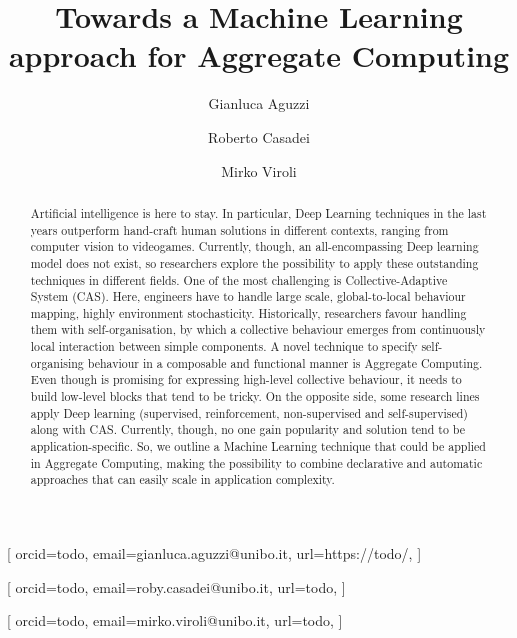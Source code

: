 \documentclass[
]{ceurart}
\begin{document}


\title{Towards a Machine Learning approach for Aggregate Computing} %

\author[1]{Gianluca Aguzzi}[%
orcid=todo,
email=gianluca.aguzzi@unibo.it,
url=https://todo/,
]
\author[2]{Roberto Casadei}[%
orcid=todo,
email=roby.casadei@unibo.it,
url=todo,
]
\author[2]{Mirko Viroli}[%
orcid=todo,
email=mirko.viroli@unibo.it,
url=todo,
]
\address[1]{Alma Mater Studiorum - Università di Bologna,
  Cesena, Italy}
\begin{abstract}
  Artificial intelligence is here to stay. 
  In particular, Deep Learning techniques in the last years outperform hand-craft human solutions in different contexts, ranging from computer vision to videogames.
  Currently, though, an all-encompassing Deep learning model does not exist, so researchers explore the possibility to apply these outstanding techniques in different fields.
  One of the most challenging is Collective-Adaptive System (CAS). Here, engineers have to handle large scale, global-to-local behaviour mapping,
  highly environment stochasticity. 
  Historically, researchers favour handling them with self-organisation, by which a collective behaviour emerges from continuously local interaction between simple components.
  A novel technique to specify self-organising behaviour in a composable and functional manner is Aggregate Computing. Even though is promising for expressing high-level collective behaviour, 
  it needs to build low-level blocks that tend to be tricky. 
  On the opposite side, some research lines apply Deep learning (supervised, reinforcement, non-supervised and self-supervised)
  along with CAS. Currently, though, no one gain popularity and solution tend to be application-specific.
  So, we outline a Machine Learning technique that could be applied in Aggregate Computing, making the possibility to combine declarative and automatic approaches that can easily scale in application complexity.
\end{abstract}
\end{document}
